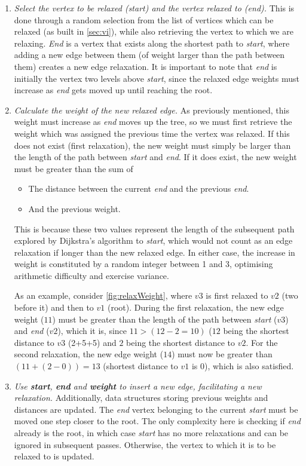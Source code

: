 \documentclass{l4proj}
\begin{document}
\begin{enumerate}[i]
	\item
	\emph{Select the vertex to be relaxed (start) and the vertex relaxed to (end).} This is done through a random selection from the list of vertices which can be relaxed (as built in \autoref{sec:vi}), while also retrieving the vertex to which we are relaxing. \emph{End} is a vertex that exists along the shortest path to \emph{start}, where adding a new edge between them (of weight larger than the path between them) creates a new edge relaxation. It is important to note that \emph{end} is initially the vertex two levels above \emph{start}, since the relaxed edge weights must increase as \emph{end} gets moved up until reaching the root.

	\item
	\emph{Calculate the weight of the new relaxed edge.} As previously mentioned, this weight must increase as \emph{end} moves up the tree, so we must first retrieve the weight which was assigned the previous time the vertex was relaxed. If this does not exist (first relaxation), the new weight must simply be larger than the length of the path between \emph{start} and \emph{end}. If it does exist, the new weight must be greater than the sum of
\begin{itemize}
	\item
	The distance between the current \emph{end} and the previous \emph{end}.
	\item
	And the previous weight. 
\end{itemize}
This is because these two values represent the length of the subsequent path explored by Dijkstra's algorithm to \emph{start}, which would not count as an edge relaxation if longer than the new relaxed edge. In either case, the increase in weight is constituted by a random integer between 1 and 3, optimising arithmetic difficulty and exercise variance.

As an example, consider \autoref{fig:relaxWeight}, where $v3$ is first relaxed to $v2$ (two before it) and then to $v1$ (root). During the first relaxation, the new edge weight ($11$) must be greater than the length of the path between \emph{start} ($v3$) and \emph{end} ($v2$), which it is, since $11 > (12 - 2 = 10)$ ($12$ being the shortest distance to $v3$ (2+5+5) and $2$ being the shortest distance to $v2$. For the second relaxation, the new edge weight ($14$) must now be greater than $(11 + (2-0)) = 13$ (shortest distance to $v1$ is $0$), which is also satisfied.

\item
\emph{Use \textbf{start}, \textbf{end} and \textbf{weight} to insert a new edge, facilitating a new relaxation.} Additionally, data structures storing previous weights and distances are updated. The \emph{end} vertex belonging to the current \emph{start} must be moved one step closer to the root. The only complexity here is checking if \emph{end} already is the root, in which case \emph{start} has no more relaxations and can be ignored in subsequent passes. Otherwise, the vertex to which it is to be relaxed to is updated.
\end{enumerate}
\end{document}
